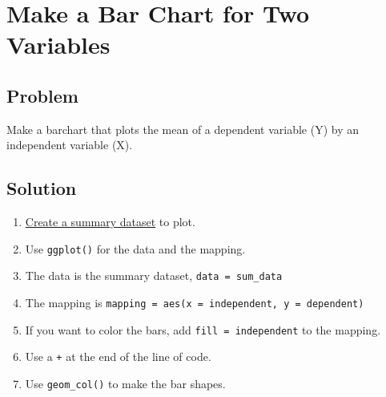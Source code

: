 \documentclass[
]{book}
\providecommand{\tightlist}{%
  \setlength{\itemsep}{0pt}\setlength{\parskip}{0pt}}
\begin{document}
\hypertarget{barchart2}{%
\section{Make a Bar Chart for Two Variables}\label{barchart2}}

\hypertarget{problem-40}{%
\subsection{Problem}\label{problem-40}}

Make a barchart that plots the mean of a dependent variable (Y) by an independent variable (X).

\hypertarget{solution-39}{%
\subsection{Solution}\label{solution-39}}

\begin{enumerate}
\def\labelenumi{\arabic{enumi}.}
\tightlist
\item
  \protect\hyperlink{sum}{Create a summary dataset} to plot.
\item
  Use \texttt{ggplot()} for the data and the mapping.
\item
  The data is the summary dataset, \texttt{data\ =\ sum\_data}
\item
  The mapping is \texttt{mapping\ =\ aes(x\ =\ independent,\ y\ =\ dependent)}
\item
  If you want to color the bars, add \texttt{fill\ =\ independent} to the mapping.
\item
  Use a \texttt{+} at the end of the line of code.
\item
  Use \texttt{geom\_col()} to make the bar shapes.
\end{enumerate}
\end{document}
